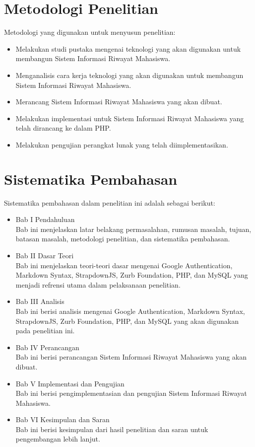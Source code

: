 \section{Metodologi Penelitian}
Metodologi yang digunakan untuk menyusun penelitian:
\begin{itemize}
	\item Melakukan studi pustaka mengenai teknologi yang akan digunakan untuk
	membangun Sistem Informasi Riwayat Mahasiswa.
	\item Menganalisis cara kerja teknologi yang akan digunakan untuk membangun
	Sistem Informasi Riwayat Mahasiswa.
	\item Merancang Sistem Informasi Riwayat Mahasiswa yang akan dibuat.
	\item Melakukan implementasi untuk Sistem Informasi Riwayat Mahasiswa yang
	telah dirancang ke dalam PHP.
	\item Melakukan pengujian perangkat lunak yang telah diimplementasikan.
\end{itemize}

\section{Sistematika Pembahasan}
Sistematika pembahasan dalam penelitian ini adalah sebagai berikut:
\begin{itemize}
	\item Bab I Pendahuluan\\
	Bab ini menjelaskan latar belakang permasalahan, rumusan masalah, tujuan,
	batasan masalah, metodologi penelitian, dan sistematika pembahasan.
	\item Bab II Dasar Teori\\
	Bab ini menjelaskan teori-teori dasar mengenai Google Authentication, Markdown
	Syntax, StrapdownJS, Zurb Foundation, PHP, dan MySQL yang menjadi refrensi
	utama dalam pelaksanaan penelitian.
	\item Bab III Analisis\\
	Bab ini berisi analisis mengenai Google Authentication, Markdown Syntax,
	StrapdownJS, Zurb Foundation, PHP, dan MySQL yang akan digunakan pada
	penelitian ini.
	\item Bab IV Perancangan\\
	Bab ini berisi perancangan Sistem Informasi Riwayat Mahasiswa yang akan dibuat.
	\item Bab V Implementasi dan Pengujian\\
	Bab ini berisi pengimplementasian dan pengujian Sistem Informasi Riwayat
	Mahasiswa.
	\item Bab VI Kesimpulan dan Saran\\
	Bab ini berisi kesimpulan dari hasil penelitian dan saran untuk pengembangan
	lebih lanjut.
\end{itemize}